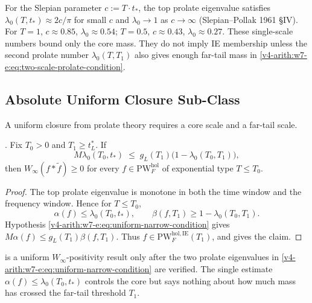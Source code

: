 \begin{remark}
\label{v4-arith:w7-e:rem:prolate-quantitative}
For the Slepian parameter \(c:=T\cdot t_{\ast}\), the top prolate
eigenvalue satisfies \(\lambda_{0}(T,t_{\ast})\approx 2c/\pi\) for
small \(c\) and \(\lambda_{0}\to 1\) as \(c\to\infty\) (Slepian--Pollak
1961 \S IV). For \(T=1\), \(c\approx 0.85\), \(\lambda_{0}\approx 0.54\);
\(T=0.5\), \(c\approx 0.43\), \(\lambda_{0}\approx 0.27\). These
single-scale numbers bound only the core mass. They do not imply IE
membership unless the second prolate number \(\lambda_{0}(T,T_{1})\)
also gives enough far-tail mass in
\eqref{v4-arith:w7-e:eq:two-scale-prolate-condition}.
\end{remark}

\subsection{Absolute Uniform Closure Sub-Class}
\label{v4-arith:w7-e:uniform-sub-class}

A uniform closure from prolate theory requires a core scale and a
far-tail scale.

\begin{corollary}
\label{v4-arith:w7-e:cor:uniform-narrow-PW}
\ClaimStatusProvedHere. Fix \(T_{0}>0\) and \(T_{1}\geq t_{L}^{\ast}\).
If
\begin{equation}
\label{v4-arith:w7-e:eq:uniform-narrow-condition}
M\lambda_{0}(T_{0},t_{\ast})\;\leq\;
g_{L}(T_{1})\bigl(1-\lambda_{0}(T_{0},T_{1})\bigr),
\end{equation}
then \(W_{\infty}(f*\widetilde{f})\geq0\) for every
\(f\in\mathrm{PW}^{\mathrm{hol}}_{F}\) of exponential type \(T\leq T_{0}\).
\end{corollary}

\begin{proof}
The top prolate eigenvalue is monotone in both the time window and the
frequency window. Hence for \(T\leq T_{0}\),
\[
\alpha(f)\leq\lambda_{0}(T_{0},t_{\ast}),\qquad
\beta(f,T_{1})\geq1-\lambda_{0}(T_{0},T_{1}).
\]
Hypothesis \eqref{v4-arith:w7-e:eq:uniform-narrow-condition} gives
\(M\alpha(f)\leq g_{L}(T_{1})\beta(f,T_{1})\). Thus
\(f\in\mathrm{PW}^{\mathrm{hol},\mathrm{IE}}_{F}(T_{1})\), and
 gives the claim.
\end{proof}

\begin{remark}[significance]
\label{v4-arith:w7-e:rem:narrow-PW-significance}
 is a uniform
\(W_{\infty}\)-positivity result only after the two prolate eigenvalues in
\eqref{v4-arith:w7-e:eq:uniform-narrow-condition} are verified. The
single estimate \(\alpha(f)\leq\lambda_{0}(T_{0},t_{\ast})\) controls
the core but says nothing about how much mass has crossed the far-tail
threshold \(T_{1}\).
\end{remark}

